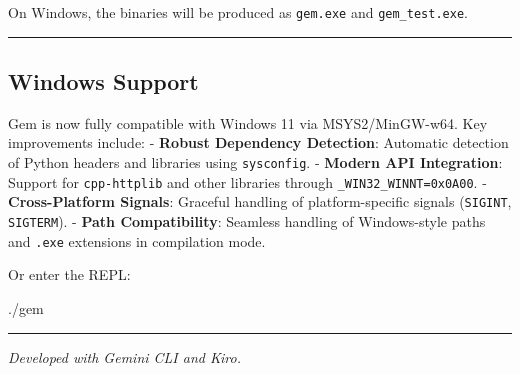 \documentclass[
]{article}
\newenvironment{Shaded}{}{}
\newcommand{\ExtensionTok}[1]{#1}
\begin{document}
On Windows, the binaries will be produced as \texttt{gem.exe} and
\texttt{gem\_test.exe}.

\begin{center}\rule{0.5\linewidth}{0.5pt}\end{center}

\subsection{Windows Support}\label{windows-support}

Gem is now fully compatible with Windows 11 via MSYS2/MinGW-w64. Key
improvements include: - \textbf{Robust Dependency Detection}: Automatic
detection of Python headers and libraries using \texttt{sysconfig}. -
\textbf{Modern API Integration}: Support for \texttt{cpp-httplib} and
other libraries through \texttt{\_WIN32\_WINNT=0x0A00}. -
\textbf{Cross-Platform Signals}: Graceful handling of platform-specific
signals (\texttt{SIGINT}, \texttt{SIGTERM}). - \textbf{Path
Compatibility}: Seamless handling of Windows-style paths and
\texttt{.exe} extensions in compilation mode.

Or enter the REPL:

\begin{Shaded}
\begin{Highlighting}[]
\ExtensionTok{./gem}
\end{Highlighting}
\end{Shaded}

\begin{center}\rule{0.5\linewidth}{0.5pt}\end{center}

\emph{Developed with Gemini CLI and Kiro.}
\end{document}
